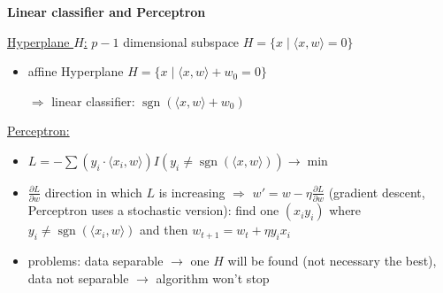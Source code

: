 \documentclass[10pt,landscape,a4paper]{article}
\DeclareMathOperator{\sgn}{sgn}
\begin{document}
\begin{multicols*}{4}
\begin{center}
	\normalsize{\textbf{Linear classifier and Perceptron}} \\
\end{center}
\underline{Hyperplane $H$:} $p-1$ dimensional subspace $H=\{x\mid \langle x,w\rangle = 0\}$
\begin{itemize}
	\item affine Hyperplane $H = \{x\mid \langle x,w\rangle + w_0 = 0\}$
	\item[$\Rightarrow$] linear classifier: $\sgn(\langle x,w\rangle + w_0)$
\end{itemize}
\underline{Perceptron:}
\begin{itemize}
	\item $L=-\sum (y_i\cdot\langle x_i,w\rangle)I(y_i\neq\sgn(\langle x,w\rangle))\to\min$
	\item $\frac{\partial L}{\partial w}$ direction in which $L$ is increasing $\Rightarrow$ $w'=w-\eta\frac{\partial L}{\partial w}$ (gradient descent, Perceptron uses a stochastic version): find one $(x_iy_i)$ where $y_i\neq\sgn(\langle x_i,w\rangle)$ and then $w_{t+1}=w_t + \eta y_ix_i$
	\item problems: data separable $\to$ one $H$ will be found (not necessary the best), data not separable $\to$ algorithm won't stop
\end{itemize}


\end{multicols*}
\end{document}
